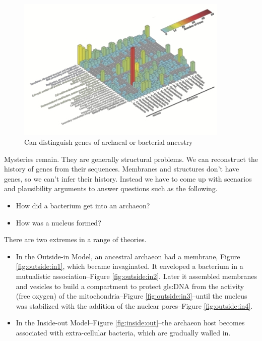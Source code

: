 \documentclass[]{article}
\begin{document}
\begin{figure}[H]
	\caption[Can distinguish genes of archaeal or bacterial ancestry]{Can distinguish genes of archaeal or bacterial ancestry\cite{thiergart2012evolutionary}}
	\label{fig:distinguish:genes:archaeal:bacterial}
	\includegraphics[width=0.9\textwidth]{thiergart2012}
\end{figure}

Mysteries remain. They are generally structural problems. We can reconstruct the history of genes from their sequences. Membranes and structures don't have genes, so we can't infer their history. Instead we have to come up with scenarios and plausibility arguments to answer questions such as the following. 

\begin{itemize}
	\item How did a bacterium get into an archaeon? 
	\item How was a nucleus formed?
\end{itemize}

There are two extremes in a range of theories.
\begin{itemize}
	\item In the Outside-in Model, an ancestral archaeon had a membrane, Figure \ref{fig:outside:in1}, which became invaginated. It enveloped a bacterium in a mutualistic association--Figure \ref{fig:outside:in2}. Later it assembled membranes and vesicles to build a compartment to protect \gls{gls:DNA} from the activity (free oxygen) of the mitochondria--Figure \ref{fig:outside:in3}--until the nucleus was stabilized with the addition of the nuclear pores--Figure \ref{fig:outside:in4}.
	\item In the Inside-out Model--Figure \ref{fig:inside:out}--the archaeon host becomes associated with extra-cellular bacteria, which are gradually walled in.
\end{itemize}
\end{document}
